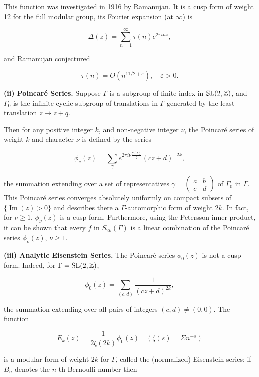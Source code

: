 This function was investigated in 1916 by Ramanujan. It is a cusp form of weight 12 for the full modular group, its Fourier expansion (at $\infty$) is

\[
\Delta(z) = \sum_{n=1}^{\infty} \tau(n) e^{2\pi inz},
\]

and Ramanujan conjectured

\[
\tau(n) = O\!\left(n^{11/2 + \varepsilon}\right), \quad \varepsilon > 0.
\]

\textbf{(ii) Poincar\'e Series.} Suppose $\Gamma$ is a subgroup of finite index in $\operatorname{SL}(2,\mathbb{Z})$, and $\Gamma_0$ is the infinite cyclic subgroup of translations in $\Gamma$ generated by the least translation $z \to z + q$.

Then for any positive integer $k$, and non-negative integer $\nu$, the Poincar\'e series of weight $k$ and character $\nu$ is defined by the series

\begin{equation}\label{eq:1.13}
\phi_{\nu}(z) = \sum_{\gamma} e^{2\pi i\nu \frac{\gamma(z)}{q}} (cz + d)^{-2k},\tag{1.13}
\end{equation}

the summation extending over a set of representatives $\gamma = \begin{pmatrix} a & b \\ c & d \end{pmatrix}$ of $\Gamma_0$ in $\Gamma$. This Poincar\'e series converges absolutely uniformly on compact subsets of $\{\operatorname{Im}(z) > 0\}$ and describes there a $\Gamma$-automorphic form of weight $2k$. In fact, for $\nu \geq 1$, $\phi_{\nu}(z)$ is a cusp form. Furthermore, using the Petersson inner product, it can be shown that every $f$ in $S_{2k}(\Gamma)$ is a linear combination of the Poincar\'e series $\phi_{\nu}(z)$, $\nu \geq 1$.

\textbf{(iii) Analytic Eisenstein Series.} The Poincar\'e series $\phi_0(z)$ is not a cusp form. Indeed, for $\Gamma = \operatorname{SL}(2,\mathbb{Z})$,

\[
\phi_0(z) = \sum_{(c,d)} \frac{1}{(cz + d)^{2k}},
\]

the summation extending over all pairs of integers $(c,d) \neq (0,0)$. The function

\begin{equation}\label{eq:1.14}
E_k(z) = \frac{1}{2\zeta(2k)} \phi_0(z) \quad (\zeta(s) = \Sigma n^{-s})\tag{1.14}
\end{equation}

is a modular form of weight $2k$ for $\Gamma$, called the (normalized) Eisenstein series; if $B_n$ denotes the $n$-th Bernoulli number then

